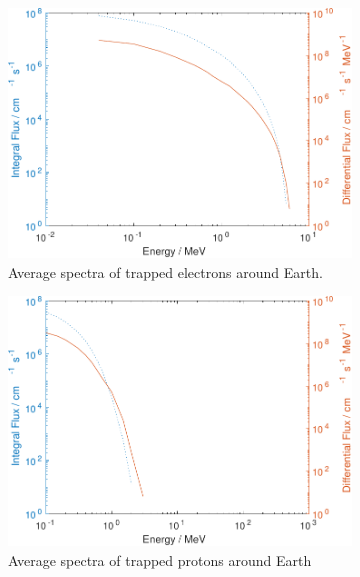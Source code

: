 \begin{figure}[htb]
     \centering
     \begin{subfigure}[b]{0.475\textwidth}
         \centering
         \includegraphics[width=\textwidth]{Media/E_Electron_Flux}
         \caption{Average spectra of trapped electrons around Earth.}
         \label{fig:trappedelectronsEarth}
     \end{subfigure}
     \hfill
     \begin{subfigure}[b]{0.475\textwidth}
         \centering
         \includegraphics[width=\textwidth]{Media/E_Proton_Flux}
         \caption{Average spectra of trapped protons around Earth}
         \label{fig:trappedprotonsEarth}
     \end{subfigure}
     \hfill
     \begin{subfigure}[b]{0.475\textwidth}

\end{subfigure}
\end{figure}
